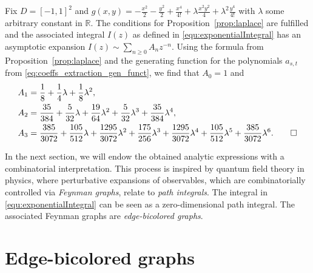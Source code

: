 \documentclass[english]{ourlematemasingle}
\numberwithin{theorem}{section}
\theoremstyle{remark}
\newenvironment{example}
{\pushQED{\qed}\renewcommand{\qedsymbol}{$\diamond$}\examplex}
{\popQED\endexamplex}
\newcommand{\R}{\mathbb{R}}
\begin{document}
\begin{example}
\label{ex:Ising_model_deg4_part1}
Fix $D = [-1,1]^2$ and $g(x,y) = -\frac{x^2}{2} - \frac{y^2}{2} + \frac{x^4}{4!} + \lambda \frac{x^2 y^2}{4} + \lambda^2 \frac{y^4}{4!}$ with $\lambda$ some arbitrary constant in $\R$. 
The conditions for Proposition~\ref{prop:laplace} are fulfilled and the associated integral $I(z)$ as defined in \eqref{equ:exponentialIntegral} has an asymptotic expansion
$ I(z) \sim \sum_{n \geq 0} A_n z^{-n}$.
Using the formula from Proposition~\ref{prop:laplace} and the generating function for the polynomials $a_{s,t}$ from \eqref{eq:coeffs_extraction_gen_funct}, we find that $A_0=1$ and
    \begin{align*}
        A_1 &= \frac{1}{8} + \frac{1}{4}\lambda + \frac{1}{8}\lambda^2, \\
        A_2 &= \frac{35}{384} + \frac{5}{32}\lambda + \frac{19}{64}\lambda^2 + \frac{5}{32}\lambda^3 + \frac{35}{384}\lambda^4,\\
        A_3 &= \frac{385}{3072} + \frac{105}{512}\lambda + \frac{1295}{3072}\lambda^2 + \frac{175}{256}\lambda^3 + \frac{1295}{3072}\lambda^4 + \frac{105}{512}\lambda^5 + \frac{385}{3072}\lambda^6.
    \qedhere
    \end{align*}
\end{example}

In the next section, we will endow the obtained analytic expressions with a combinatorial interpretation. This process is inspired by quantum field theory in physics, where perturbative expansions of observables, which are combinatorially controlled via \emph{Feynman graphs}, relate to \emph{path integrals}. The integral in \eqref{equ:exponentialIntegral} can be seen as a zero-dimensional path integral. The associated Feynman graphs are \emph{edge-bicolored graphs}.

\section{Edge-bicolored graphs}
\label{sec:graphs}
\end{document}
